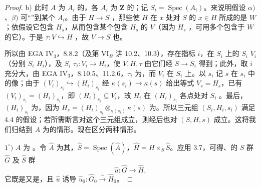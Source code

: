 \begin{proof}
b) 此时 $A$ 为 $A_i$ 的，各 $A_i$ 为 $\mathbf Z$ 的；记 $S_i=\operatorname{Spec}(A_i)$。来说明假设 $\alpha)$、$\beta)$ 可“”到某个 $A_i$。由于 $H\to S$ ，那些使 $H$ 在 $x$ 处对 $S$ 的 $x\in H$ 所成的是 $W$；依假设它包含 $H_s$，从而包含某个包含 $H_s$ 的 $V$（因为 $H_s$ ，可用多个包含于 $W$ 的它）。于是 $\tau:V\hookrightarrow H$ ，故 $V\to S$ 也。

所以由 EGA IV$_3$，8.8.2（及第 VI$_B$ 讲 10.2、10.3），存在指标 $i$，在 $S_i$ 上的 $S_i$  $V_i$（分别 $S_i$  $H_i$），及 $S_i$  $\tau_i:V_i\to H_i$，使 $V,H,\tau$ 由它们经 $S\to S_i$ 得到；此外，取 $i$ 充分大，由 EGA IV$_3$，8.10.5、11.2.6，$\tau_i$ 为，而 $V_i$ 在 $S_i$ 上。以 $s_i$ 记 $s$ 在 $s_i$ 中的像；由于 $(V_i)_{s_i}\hookrightarrow(H_i)_{s_i}$ 经 $\kappa(s_i)\to\kappa(s)$ 给出等式 $V_s=H_s$，已有 $(V_i)_{s_i}=(H_i)_{s_i}$，即 $(H_i)_{s_i}\subseteq V_i$，故 $H_i$ 在 $(H_i)_{s_i}$ 各点处对 $S_i$ 。最后，$(H_i)_{s_i}$ 为，因为 $H_s=(H_i)_{s_i}\otimes_{\kappa(s_i)}\kappa(s)$ 为。所以三元组 $(S_i,H_i,s_i)$ 满足 4.4 的假设；若所需断言对这个三元组成立，则经后也对 $(S,H,s)$ 成立。这将我们归结到 $A$ 为的情形。现在区分两种情形。

$1^\circ)$ $A$ 为 。令 $\widehat A$ 为其，$\widehat S=\operatorname{Spec}(\widehat A)$，$\widehat H=H\times_S\widehat S$。应用 3.7，可得、的 $\widehat S$ 群 $\widehat G$ 及 $\widehat S$ 群
\[
\widehat u:\widehat G\longrightarrow\widehat H,
\]
它既是又是，且 $\widehat u$ 诱导 $\widehat u_0:\widehat G_0\xrightarrow{\sim}\widehat H_0$。


\end{proof}
